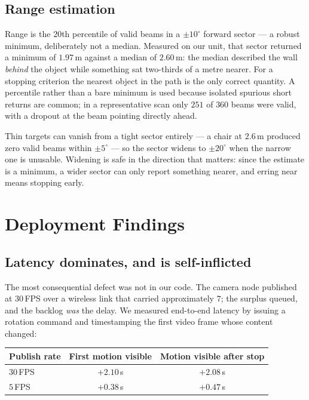 \documentclass[conference]{IEEEtran}
\begin{document}
\subsection{Range estimation}

Range is the $20$th percentile of valid beams in a $\pm10^\circ$ forward sector
--- a robust minimum, deliberately not a median. Measured on our unit, that
sector returned a minimum of $1.97$\,m against a median of $2.60$\,m: the median
described the wall \emph{behind} the object while something sat two-thirds of a
metre nearer. For a stopping criterion the nearest object in the path is the
only correct quantity. A percentile rather than a bare minimum is used because
isolated spurious short returns are common; in a representative scan only $251$
of $360$ beams were valid, with a dropout at the beam pointing directly ahead.

Thin targets can vanish from a tight sector entirely --- a chair at $2.6$\,m
produced zero valid beams within $\pm5^\circ$ --- so the sector widens to
$\pm20^\circ$ when the narrow one is unusable. Widening is safe in the direction
that matters: since the estimate is a minimum, a wider sector can only report
something nearer, and erring near means stopping early.

\section{Deployment Findings}
\label{sec:findings}

\subsection{Latency dominates, and is self-inflicted}

The most consequential defect was not in our code. The camera node published at
$30$\,FPS over a wireless link that carried approximately $7$; the surplus
queued, and the backlog \emph{was} the delay. We measured end-to-end latency by
issuing a rotation command and timestamping the first video frame whose content
changed:

\begin{center}
\begin{tabular}{lcc}
\toprule
Publish rate & First motion visible & Motion visible after stop \\
\midrule
$30$\,FPS & $+2.10$\,s & $+2.08$\,s \\
$5$\,FPS  & $+0.38$\,s & $+0.47$\,s \\
\bottomrule
\end{tabular}
\end{center}
\end{document}
